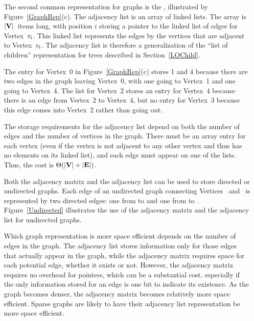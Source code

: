 The second common representation for graphs is the
,
illustrated by Figure~\ref{GraphRep}(c).
The adjacency list is an array of linked lists.
The array is \(|{\textbf{V}}|\)~items long, with position \(i\) storing a
pointer to the linked list of edges for Vertex~\({\textit{v}}_i\).
This linked list represents the edges by the vertices that are
adjacent to Vertex~\({\textit{v}}_i\).
The adjacency list is therefore a generalization of the
``list of children'' representation for trees described in
Section~\ref{LOChild}.

\begin{example}
The entry for Vertex~0 in Figure~\ref{GraphRep}(c) stores 1 and 4
because there are two edges in the graph leaving Vertex~0, with one
going to Vertex~1 and one going to Vertex~4.
The list for Vertex~2 stores an entry for Vertex~4 because there is an
edge from Vertex~2 to Vertex~4, but no entry for Vertex~3 because this
edge comes into Vertex~2 rather than going out.
\end{example}

The storage requirements for the adjacency list depend on both the
number of edges and the number of vertices in the graph.
There must be an array entry for each vertex (even if the vertex is
not adjacent to any other vertex and thus has no elements on its
linked list), and each edge must appear on one of the lists.
Thus, the cost is \(\Theta(|{\textbf{V}}| + |{\textbf{E}}|)\).

Both the adjacency matrix and the adjacency list can be used to store
directed or undirected
graphs. 
Each edge of an undirected graph connecting Vertices~
and~ is represented by two directed edges: one from
 to  and one from  to .
Figure~\ref{Undirected} illustrates the use of the adjacency matrix
and the adjacency list for undirected graphs.

Which graph representation is more space efficient depends on the
number of edges in the graph.
The adjacency list stores information only for those edges that
actually appear in the graph, while the adjacency matrix requires
space for each potential edge, whether it exists or not.
However, the adjacency matrix requires no overhead for pointers,
which can be a substantial cost, especially if the only information
stored for an edge is one bit to indicate its existence.
As the graph becomes denser, the adjacency matrix becomes
relatively more space efficient.
Sparse graphs are likely to have their adjacency list representation
be more space efficient.

